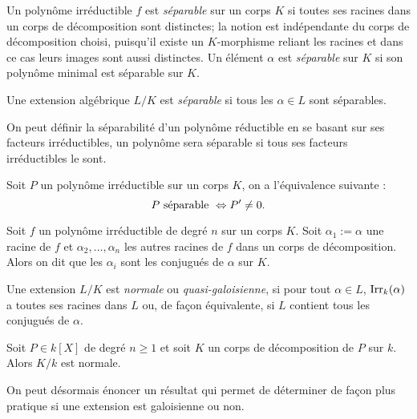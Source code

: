 \documentclass[a4paper]{article} %
\numberwithin{section}{part}
\numberwithin{equation}{section}
\newcommand\Irr[2]{\textup{Irr}_{#1}(#2)}
\begin{document}
Un polynôme irréductible $f$ est \emph{séparable} sur un corps $K$ si toutes
ses racines dans un corps de décomposition sont distinctes; la notion est
indépendante du corps de décomposition choisi, puisqu'il existe un $K$-morphisme
reliant les racines et dans ce cas leurs images sont aussi distinctes. 
Un élément $\alpha$ est \emph{séparable} sur $K$ si son polynôme minimal est 
séparable sur $K$.

\begin{defn}
\label{def:sep}
Une extension algébrique $L/K$ est \emph{séparable} si tous les $\alpha\in L$
sont séparables.
\end{defn}

\begin{rem}
On peut définir la séparabilité d'un polynôme réductible en se basant sur ses
facteurs irréductibles, un polynôme sera séparable si tous ses facteurs
irréductibles le sont.
\end{rem}

\begin{prop}
\label{prop:sepderiv}
Soit $P$ un polynôme irréductible sur un corps $K$, on a l'équivalence suivante 
:
\begin{equation}
P\textup{ séparable } \Leftrightarrow P'\neq 0.
\end{equation}
\end{prop}

Soit $f$ un polynôme irréductible de degré $n$ sur un corps $K$. Soit $\alpha_1 
:= \alpha$ une racine de $f$ et $\alpha_2,\dots,\alpha_n$ les autres racines de 
$f$ dans un corps de décomposition. Alors on dit que les $\alpha_i$ sont les 
conjugués de $\alpha$ sur $K$.
\begin{defn}
Une extension $L/K$ est \emph{normale} ou \emph{quasi-galoisienne}, si pour tout
$\alpha\in L$, $\Irr{k}{\alpha}$ a toutes ses racines dans $L$ ou, de façon 
équivalente, si $L$ contient tous les conjugués de $\alpha$.
\end{defn}

\begin{prop}
\label{prop:decompnorm}
Soit $P\in k[X]$ de degré $n\geq 1$ et soit $K$ un corps de décomposition de $P$
sur $k$. Alors $K/k$ est normale.
\end{prop}

On peut désormais énoncer un résultat qui permet de déterminer de façon plus
pratique si une extension est galoisienne ou non.
\end{document}
